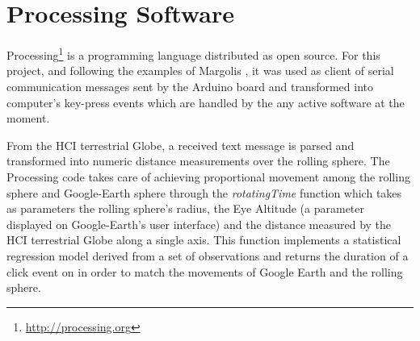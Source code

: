 \documentclass[12pt]{article}
\begin{document}
\section{Processing Software}

Processing\footnote{\url{http://processing.org}} is a programming language distributed as open source. For this project, and following the examples of Margolis \cite{Margolis}, it was used as client of serial communication messages sent by the Arduino board and transformed into computer's key-press events which are handled by the any active software at the moment. 

From the HCI terrestrial Globe, a received text message is parsed and transformed into numeric distance measurements over the rolling sphere. The Processing code takes care of achieving proportional movement among the rolling sphere and Google-Earth sphere through the \textit{rotatingTime} function which takes as parameters the rolling sphere's radius, the Eye Altitude (a parameter displayed on Google-Earth's user interface) and the distance measured by the HCI terrestrial Globe along a single axis. This function implements a statistical regression model derived from a set of observations and returns the duration of a click event on in order to match the movements of Google Earth  and the rolling sphere.
\end{document}
